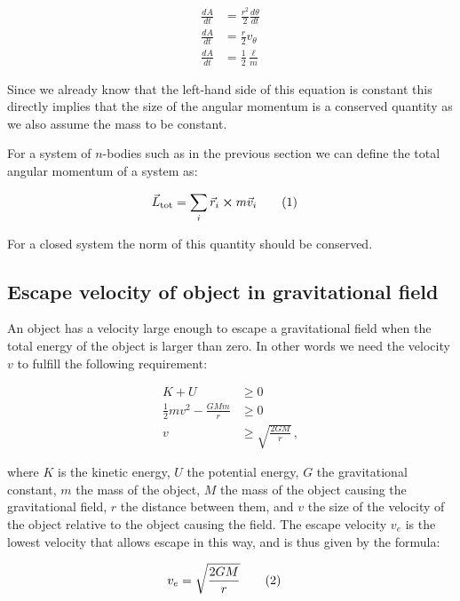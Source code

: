 \documentclass[reprint,english,notitlepage]{revtex4-1}  %
\newcommand\numberthis{\addtocounter{equation}{1}\tag{\theequation}}
\begin{document}
\begin{align*}
\frac{dA}{dt} &= \frac{r^2}{2} \frac{d\theta}{dt} \\
\frac{dA}{dt} &= \frac{r}{2} v_\theta \\
\frac{dA}{dt} &= \frac{1}{2} \frac{\ell}{m} 
\end{align*}

Since we already know that the left-hand side of this equation is constant this directly implies that the size of the angular momentum is a conserved quantity as we also assume the mass to be constant. 

For a system of $n$-bodies such as in the previous section we can define the total angular momentum of a system as:

\begin{align*}
\vec{L}_\text{tot} &= \sum\limits_i \vec{r}_i \cross m\vec{v}_i \numberthis \label{eq:tot_ang_mom}
\end{align*}

For a closed system the norm of this quantity should be conserved.

\subsection{Escape velocity of object in gravitational field} \label{sec:II:e}

An object has a velocity large enough to escape a gravitational field when the total energy of the object is larger than zero. In other words we need the velocity $v$ to fulfill the following requirement:

\begin{align*}
K + U &\geq 0 \\
\frac{1}{2}mv^2 - \frac{GMm}{r} &\geq 0 \\
v &\geq \sqrt{\frac{2GM}{r}} \, ,
\end{align*}

where $K$ is the kinetic energy, $U$ the potential energy, $G$ the gravitational constant, $m$ the mass of the object, $M$ the mass of the object causing the gravitational field, $r$ the distance between them, and $v$ the size of the velocity of the object relative to the object causing the field. The escape velocity $v_e$ is the lowest velocity that allows escape in this way, and is thus given by the formula:

\begin{align*}
v_e &= \sqrt{\frac{2GM}{r}} \numberthis \label{eq:esc_vel}
\end{align*}
\end{document}

